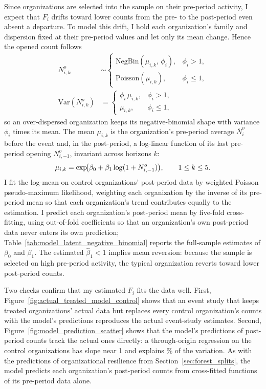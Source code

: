 \documentclass[12pt,notitlepage]{article}
\begin{document}
Since organizations are selected into the sample on their pre-period activity, I expect that $F_i$ drifts toward lower counts from the pre- to the post-period even absent a departure.
To model this drift, I hold each organization's family and dispersion fixed at their pre-period values and let only its mean change.
Hence the opened count follows
\begin{equation}\label{eq:latent_negative_binomial}
\begin{aligned}
N_{i,k}^o &\sim
\begin{cases}
\mathrm{NegBin}(\mu_{i,k},\,\phi_i), & \phi_i > 1,\\
\mathrm{Poisson}(\mu_{i,k}),         & \phi_i \le 1,
\end{cases}
\\[4pt]
\mathrm{Var}(N_{i,k}^o) &=
\begin{cases}
\phi_i\,\mu_{i,k}, & \phi_i > 1,\\
\mu_{i,k},         & \phi_i \le 1,
\end{cases}
\end{aligned}
\end{equation}
so an over-dispersed organization keeps its negative-binomial shape with variance $\phi_i$ times its mean.
The mean $\mu_{i,k}$ is the organization's pre-period average $\overline{N}_i^o$ before the event and, in the post-period, a log-linear function of its last pre-period opening $N_{i,-1}^o$, invariant across horizons $k$:
\begin{equation}\label{eq:latent_mean}
\mu_{i,k} = \exp\!\bigl(\beta_0 + \beta_1 \log(1 + N_{i,-1}^o)\bigr), \qquad 1 \le k \le 5.
\end{equation} 
I fit the log-mean on control organizations' post-period data by weighted Poisson pseudo-maximum likelihood, weighting each organization by the inverse of its pre-period mean so that each organization's trend contributes equally to the estimation.
I predict each organization's post-period mean by five-fold cross-fitting, using out-of-fold coefficients so that an organization's own post-period data never enters its own prediction; Table~\ref{tab:model_latent_negative_binomial} reports the full-sample estimates of $\beta_0$ and $\beta_1$.
The estimated $\hat{\beta}_1<1$ implies mean reversion: because the sample is selected on high pre-period activity, the typical organization reverts toward lower post-period counts.

Two checks confirm that my estimated $F_i$ fits the data well.
First, Figure~\ref{fig:actual_treated_model_control} shows that an event study that keeps treated organizations' actual data but replaces every control organization's counts with the model's predictions reproduces the actual event-study estimates.
Second, Figure~\ref{fig:model_prediction_scatter} shows that the model's predictions of post-period counts track the actual ones directly: a through-origin regression on the control organizations has slope near 1 and explains \ScatterControlRSquaredPct\% of the variation.
As with the predictions of organizational resilience from Section~\ref{sec:forest_splits}, the model predicts each organization's post-period counts from cross-fitted functions of its pre-period data alone.
\end{document}
